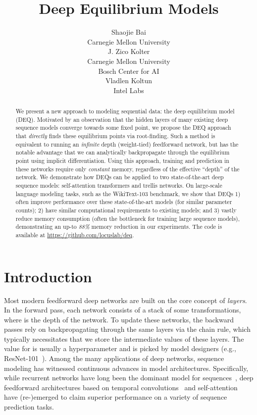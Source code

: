 \documentclass{article}
\title{Deep Equilibrium Models}
\author{Shaojie Bai  \\
  Carnegie Mellon University\\
\And
  J. Zico Kolter \\
  Carnegie Mellon University \\ Bosch Center for AI\\
  \And
  Vladlen Koltun \\
  Intel Labs
}
\begin{document}
\maketitle

\begin{abstract}
  We present a new approach to modeling sequential data: the deep equilibrium model (DEQ).  Motivated by an observation that the hidden layers of many existing deep sequence models converge towards some fixed point, we propose the DEQ approach that \emph{directly} finds these equilibrium points via root-finding.  Such a method is equivalent to running an \emph{infinite} depth (weight-tied) feedforward network, but has the notable advantage that we can analytically backpropagate through the equilibrium point using implicit differentiation.  Using this approach, training and prediction in these networks require only \emph{constant} memory, regardless of the effective ``depth'' of the network.  We demonstrate how DEQs can be applied to two state-of-the-art deep sequence models: self-attention transformers and trellis networks.  On large-scale language modeling tasks, such as the WikiText-103 benchmark, we show that DEQs 1) often improve performance over these state-of-the-art models (for similar parameter counts); 2) have similar computational requirements to existing models; and 3) vastly reduce memory consumption (often the bottleneck for training large sequence models), demonstrating an up-to \emph{88\%} memory reduction in our experiments. The code is available at \url{https://github.com/locuslab/deq}.
\end{abstract}

\section{Introduction}

Most modern feedforward deep networks are built on the core concept of \emph{layers}. In the forward pass, each network consists of a stack of some  transformations, where  is the depth of the network.  To update these networks, the backward passes rely on backpropagating through the same  layers via the chain rule, which typically necessitates that we store the intermediate values of these layers. The value for  is usually a hyperparameter and is picked by model designers (e.g., ResNet-101~\cite{he2016deep}).  Among the many applications of deep networks, sequence modeling has witnessed continuous advances in model architectures. Specifically, while recurrent networks have long been the dominant model for sequences~\citep{Elman90findstructure,hochreiterLSTM,choGRU,merityRegOpt}, deep feedforward architectures based on temporal convolutions~\citep{waibel,waveNet,bai2018empirical} and self-attention~\citep{vaswani2017attention,dai2018transformer,child2019generating} have (re-)emerged to claim superior performance on a variety of sequence prediction tasks.
\end{document}
